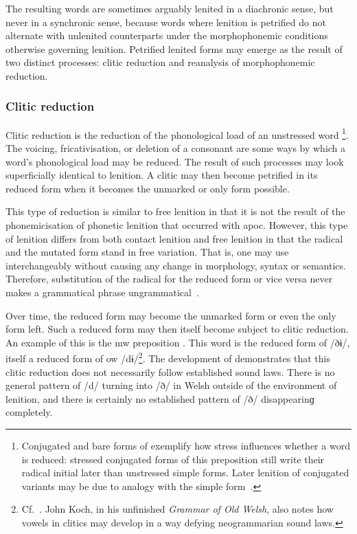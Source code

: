 The resulting words are sometimes  arguably lenited in a diachronic sense, but never in a synchronic sense, because words where lenition is petrified do not alternate with unlenited counterparts under the morphophonemic conditions otherwise governing lenition. Petrified lenited forms may emerge as the result of two distinct processes: clitic reduction and reanalysis of morphophonemic reduction.

\subsubsection{Clitic reduction}
\label{sec:clitic-reduction}
Clitic reduction is the reduction of the phonological load of an unstressed word%
\footnote{Conjugated and bare forms of  exemplify how stress influences whether a word is reduced: stressed conjugated forms of this preposition still write their radical initial later than unstressed simple forms. Later lenition of conjugated variants may be due to analogy with the simple form~\autocite[54]{jongeleen_lenition_2016}.}. 
The voicing, fricativisation, or deletion of a consonant are some ways by which a word's phonological load may be reduced.
The result of such processes may look superficially identical to lenition.
A clitic may then become petrified in its reduced form when it becomes the unmarked or only form possible. 

This type of reduction is similar to free lenition in that it is not the result of the phonemicisation of phonetic lenition that occurred with \gls{apoc}.
However, this type of lenition differs from both contact lenition and free lenition in that the radical and the mutated form stand in free variation.
That is, one may use  interchangeably without causing any change in morphology, syntax or semantics. 
Therefore, substitution of the radical for the reduced form or vice versa never makes a grammatical phrase ungrammatical~\autocite[451--453]{morgan_y_1952}. 

Over time, the reduced form may become the unmarked form or even the only form left. 
Such a reduced form may then itself become subject to clitic reduction. 
An example of this is the \gls{mw} preposition . 
This word is the reduced form of  /ðɨ/, itself a reduced form of \gls{ow}  /dɨ/\footnote{Cf.\ . John Koch, in his unfinished \emph{Grammar of Old Welsh}, also notes how vowels in clitics may develop in a way defying neogrammarian sound laws.}. 
The development of  demonstrates that this clitic reduction does not necessarily follow established sound laws. 
There is no general pattern of /d/ turning into /ð/ in Welsh outside of the environment of lenition, and there is certainly no established pattern of /ð/ disappearinɡ completely.

